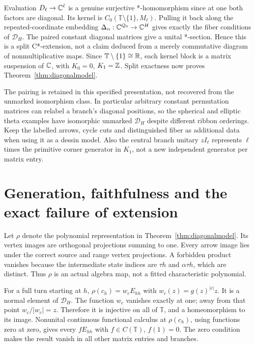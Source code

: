 Evaluation $D_\ell\to\mathbb C^\ell$ is a genuine surjective *-homomorphism since at one both factors are diagonal. Its kernel is $C_0(\mathbb T\setminus\{1\},M_\ell)$. Pulling it back along the repeated-coordinate embedding $\Delta_\alpha:\mathbb C^{Q_0}\to\mathbb C^H$ gives exactly the fiber conditions of $\mathcal D_H$. The paired constant diagonal matrices give a unital *-section. Hence this is a split C*-extension, not a claim deduced from a merely commutative diagram of nonmultiplicative maps. Since $\mathbb T\setminus\{1\}\cong\mathbb R$, each kernel block is a matrix suspension of $\mathbb C$, with $K_0=0$, $K_1=\mathbb Z$. Split exactness now proves Theorem~\ref{thm:diagonalmodel}.

The pairing is retained in this specified presentation, not recovered from the unmarked isomorphism class. In particular arbitrary constant permutation matrices can relabel a branch's diagonal positions, so the spherical and elliptic theta examples have isomorphic unmarked $\mathcal D_H$ despite different ribbon orderings. Keep the labelled arrows, cycle cuts and distinguished fiber as additional data when using it as a dessin model. Also the central branch unitary $zI_\ell$ represents $\ell$ times the primitive corner generator in $K_1$, not a new independent generator per matrix entry.

\section{Generation, faithfulness and the exact failure of extension}
Let $\rho$ denote the polynomial representation in Theorem~\ref{thm:diagonalmodel}. Its vertex images are orthogonal projections summing to one. Every arrow image lies under the correct source and range vertex projections. A forbidden product vanishes because the intermediate state indices are $\tau h$ and $\alpha\tau h$, which are distinct. Thus $\rho$ is an actual algebra map, not a fitted characteristic polynomial.

For a full turn starting at $h$, $\rho(c_h)=w_cE_{hh}$ with $w_c(z)=g(z)^{|c|}z$. It is a normal element of $\mathcal D_H$. The function $w_c$ vanishes exactly at one; away from that point $w_c/|w_c|=z$. Therefore it is injective on all of $\mathbb T$, and a homeomorphism to its image. Nonunital continuous functional calculus at $\rho(c_h)$, using functions zero at zero, gives every $fE_{hh}$ with $f\in C(\mathbb T)$, $f(1)=0$. The zero condition makes the result vanish in all other matrix entries and branches.


